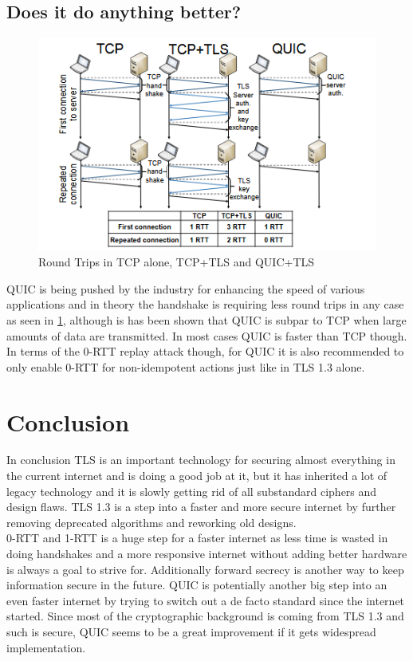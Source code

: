 \documentclass[a4paper,conference]{IEEEtran}
\begin{document}
\subsection{Does it do anything better?}
\begin{figure}
  \includegraphics[width=\linewidth]{figures/rttspeed.png}
  \caption{Round Trips in TCP alone, TCP+TLS and QUIC+TLS\cite{7510788}}
  \label{fig:rtt}
\end{figure}
QUIC is being pushed by the industry for enhancing the speed of various applications and in theory the handshake is requiring less round trips in any case as seen in \cref{fig:rtt}, although is has been shown that QUIC is subpar to TCP when large amounts of data are transmitted. In most cases QUIC is faster than TCP though\cite{7510788}.
 In terms of the 0-RTT replay attack though, for QUIC it is also recommended to only enable 0-RTT for non-idempotent actions just like in TLS 1.3 alone\cite{ietf-quic-tls-16}.


\section{Conclusion}
In conclusion TLS is an important technology for securing almost everything in the current internet and is doing a good job at it, but it has inherited a lot of legacy technology and it is slowly getting rid of all substandard ciphers and design flaws. TLS 1.3 is a step into a faster and more secure internet by further removing deprecated algorithms and reworking old designs.\\
0-RTT and 1-RTT is a huge step for a faster internet as less time is wasted in doing handshakes and a more responsive internet without adding better hardware is always a goal to strive for. Additionally forward secrecy is another way to keep information secure in the future.
QUIC is potentially another big step into an even faster internet by trying to switch out a de facto standard since the internet started. Since most of the cryptographic background is coming from TLS 1.3 and such is secure, QUIC seems to be a great improvement if it gets widespread implementation.

\end{document}
